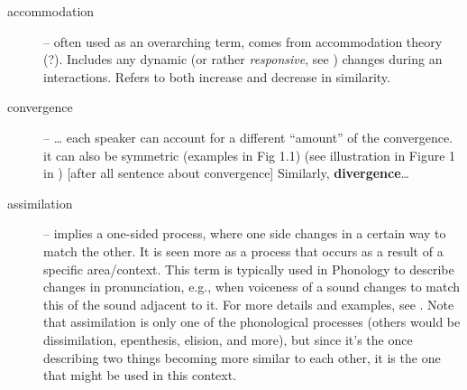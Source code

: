 \begin{description}
	\item[accommodation] -- often used as an overarching term, comes from accommodation theory (?). Includes any dynamic (or rather \emph{responsive}, see ) changes during an interactions.
	Refers to both increase and decrease in similarity.
	
	\item[convergence] -- \ldots
	each speaker can account for a different \enquote{amount} of the convergence.
	it can also be symmetric (examples in Fig 1.1)
	(see illustration in Figure 1 in \citet{Levitan2011measuring})
	[after all sentence about convergence] Similarly, \textbf{divergence}\ldots
	
	\item[assimilation] -- implies a one-sided process, where one side changes in a certain way to match the other.
	It is seen more as a process that occurs as a result of a specific area/context.
	This term is typically used in Phonology to describe changes in pronunciation, e.g., when voiceness of a sound changes to match this of the sound adjacent to it.
	For more details and examples, see \citet[][pp.\ 89-98]{Hall2011phonologie}.
	Note that assimilation is only one of the phonological processes (others would be dissimilation, epenthesis, elision, and more), but since it's the once describing two things becoming more similar to each other, it is the one that might be used in this context.
	

\end{description}
